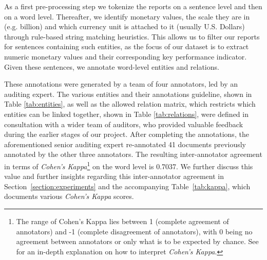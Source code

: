 \documentclass[conference, table]{IEEEtran}
\newcommand{\1} {\mathbbm{1}}
\begin{document}
As a first pre-processing step we tokenize the reports on a sentence level and then on a word level. Thereafter, we identify monetary values, the scale they are in (e.g. billion) and which currency unit is attached to it (usually U.S. Dollars) through rule-based string matching heuristics. This allows us to filter our reports for sentences containing such entities, as the focus of our dataset is to extract numeric monetary values and their corresponding key performance indicator. Given these sentences, we annotate word-level entities and relations. 

These annotations were generated by a team of four annotators, led by an auditing expert. The various entities and their annotations guideline, shown in Table \ref{tab:entities}, as well as the allowed relation matrix, which restricts which entities can be linked together, shown in Table \ref{tab:relations}, were defined in consultation with a wider team of auditors, who provided valuable feedback during the earlier stages of our project. After completing the annotations, the aforementioned senior auditing expert re-annotated 41 documents previously annotated by the other three annotators. 
The resulting inter-annotator agreement in terms of \textit{Cohen's Kappa}\footnote{The range of Cohen's Kappa lies between 1 (complete agreement of annotators) and -1 (complete disagreement of annotators), with 0 being no agreement between annotators or only what is to be expected by chance. See \cite{sim2005kappa} for an in-depth explanation on how to interpret \textit{Cohen's Kappa}.} \cite{cohen1960coefficient} on the word level is 0.7037. We further discuss this value and further insights regarding this inter-annotator agreement in Section~\ref{section:experiments} and the accompanying Table~\ref{tab:kappa}, which documents various \textit{Cohen's Kappa} scores.
\end{document}
